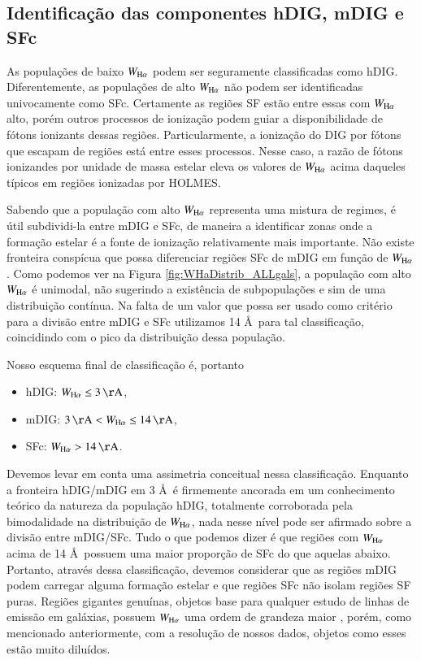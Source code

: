 \subsection{Identificação das componentes hDIG, mDIG e SFc}
\label{sec:DIGclass:identclass}

As populações de baixo $W_{\Ha}$ podem ser seguramente classificadas como hDIG. Diferentemente, as populações de alto $W_{\Ha}$ não podem ser identificadas univocamente como SFc. Certamente as regiões SF estão entre essas com $W_{\Ha}$ alto, porém outros processos de ionização podem guiar a disponibilidade de fótons ionizants dessas regiões. Particularmente, a ionização do DIG por fótons que escapam de regiões \hii está entre esses processos. Nesse caso, a razão de fótons ionizandes por unidade de massa estelar eleva os valores de $W_{\Ha}$ acima daqueles típicos em regiões ionizadas por HOLMES.

Sabendo que a população com alto $W_{\Ha}$ representa uma mistura de regimes, é útil subdividi-la entre mDIG e SFc, de maneira a identificar zonas onde a formação estelar é a fonte de ionização relativamente mais importante. Não existe fronteira conspícua que possa diferenciar regiões SFc de mDIG em função de $W_{\Ha}$. Como podemos ver na Figura \ref{fig:WHaDistrib_ALLgals}, a população com alto $W_{\Ha}$ é unimodal, não sugerindo a existência de subpopulações e sim de uma distribuição contínua. Na falta de um valor que possa ser usado como critério para a divisão entre mDIG e SFc utilizamos 14 \AA\ para tal classificação, coincidindo com o pico da distribuição dessa população.

Nosso esquema final de classificação é, portanto

\begin{itemize}
 \item hDIG: $W_{\Ha} \le 3 \,\mathrm{\AA}$,
 \item mDIG:  $3 \,\mathrm{\AA}  < W_{\Ha} \le 14 \,\mathrm{\AA}$,
 \item SFc: $W_{\Ha} > 14 \,\mathrm{\AA}$.
\end{itemize}

Devemos levar em conta uma assimetria conceitual nessa classificação. Enquanto a fronteira hDIG/mDIG em 3 \AA\ é firmemente ancorada em um conhecimento teórico da natureza da população hDIG, totalmente corroborada pela bimodalidade na distribuição de $W_{\Ha}$, nada nesse nível pode ser afirmado sobre a divisão entre mDIG/SFc. Tudo o que podemos dizer é que regiões com $W_{\Ha}$ acima de 14 \AA\ possuem uma maior proporção de SFc do que aquelas abaixo. Portanto, através dessa classificação, devemos considerar que as regiões mDIG podem carregar alguma formação estelar e que regiões SFc não isolam regiões SF puras. Regiões \hii gigantes genuínas, objetos base para qualquer estudo de linhas de emissão em galáxias, possuem $W_{\Ha}$ uma ordem de grandeza maior \citep{McCall.etal.1985, Garnett.and.Shields.1987, Kennicutt.and.Garnett.1996, Luridiana.and.Peimbert.2001, Bresolin.etal.2004}, porém, como mencionado anteriormente, com a resolução de nossos dados, objetos como esses estão muito diluídos.

